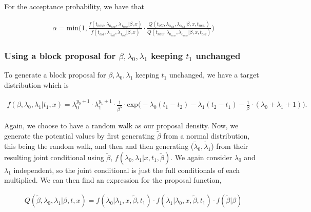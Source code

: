 For the acceptance probability, we have that

\begin{align}
    \alpha = \text{min} \Bigg(1,  \frac{
    f(t_{new}, \lambda_{0_{new}}, \lambda_{1_{new}}|\beta, x)}{f(t_{old}, \lambda_{0_{old}}, \lambda_{1_{old}}|\beta, x)}
    \cdot 
    \frac{Q(t_{old}, \lambda_{0_{old}}, \lambda_{0_{old}} | \beta, x, t_{new})}{Q(t_{new}, \lambda_{0_{new}}, \lambda_{0_{new}} | \beta, x, t_{old})} \Bigg) 
\end{align}





\subsubsection{Using a block proposal for $\beta, \lambda_0, \lambda_1$ keeping $t_1$ unchanged}

To generate a block proposal for $\beta, \lambda_0, \lambda_1$ keeping $t_1$ unchanged, we have a target distribution which is 

\begin{align}
    f(\beta, \lambda_0, \lambda_1| t_1, x) = 
    \lambda_0^{y_0 + 1} \cdot \lambda_1^{y_1 + 1} \cdot \frac{1}{\beta^5} \cdot \text{exp}\Bigg(  -\lambda_0(t_1 - t_2) 
    - \lambda_1 (t_2 - t_1 ) 
    - \frac{1}{\beta} \cdot (\lambda_0 + \lambda_1  + 1) \Bigg). 
\end{align}


Again, we choose to have a random walk as our proposal density. Now, we generate the potential values by first generating $\widetilde{\beta}$ from a normal distribution, this being the random walk, and then and then generating ($\widetilde{\lambda}_0, \widetilde{\lambda}_1$) from their resulting joint conditional using $\widetilde{\beta}$, $f(\lambda_0, \lambda_1|x,t_1,\widetilde{\beta})$. 
We again consider $\lambda_0$ and $\lambda_1$ independent, so the joint conditional is just the full conditionals of each multiplied. We can then find an expression for the proposal function,

\begin{align}
    Q(\widetilde{\beta}, \lambda_0, \lambda_1| \beta, t, x) = f(\lambda_0| \lambda_1, x, \widetilde{\beta}, t_1)\cdot f(\lambda_1| \lambda_0, x, \widetilde{\beta}, t_1)\cdot f(\widetilde{\beta}| \beta) 
\end{align}



